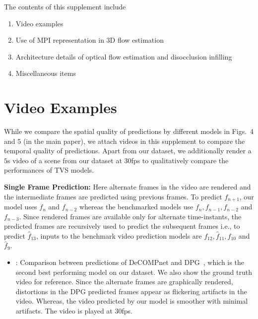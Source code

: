 \documentclass[preprint]{vgtc}
\def\ie{i.e., }
\begin{document}
\appendix
{}
    \noindent The contents of this supplement include
    \begin{enumerate}[label=\Alph*., noitemsep]
        \item Video examples
        \item Use of MPI representation in 3D flow estimation
        \item Architecture details of optical flow estimation and disocclusion infilling
        \item Miscellaneous items
    \end{enumerate}

    \section{Video Examples}\label{sec:video-examples}
    While we compare the spatial quality of predictions by different models in Figs.\ 4 and 5 (in the main paper), we attach videos in this supplement to compare the temporal quality of predictions.
    Apart from our dataset, we additionally render a $5$s video of a scene from our dataset at $30$fps to qualitatively compare the performances of TVS models.

    \textbf{Single Frame Prediction:}
    Here alternate frames in the video are rendered and the intermediate frames are predicted using previous frames.
    To predict $f_{n+1}$, our model uses $f_n$ and $f_{n-2}$ whereas the benchmarked models use $f_n, f_{n-1}, f_{n-2}$ and $f_{n-3}$.
    Since rendered frames are available only for alternate time-instants, the predicted frames are recursively used to predict the subsequent frames \ie to predict $\hat{f}_{13}$, inputs to the benchmark video prediction models are $f_{12}, \hat{f}_{11}, f_{10}$ and $\hat{f}_9$.
    \begin{itemize}
        \item {}: Comparison between predictions of DeCOMPnet and DPG~\cite{gao2019disentangling}, which is the second best performing model on our dataset.
        We also show the ground truth video for reference.
        Since the alternate frames are graphically rendered, distortions in the DPG predicted frames appear as flickering artifacts in the video.
        Whereas, the video predicted by our model is smoother with minimal artifacts.
        The video is played at 30fps.
    \end{itemize}
\end{document}

